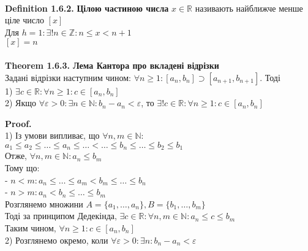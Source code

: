 \documentclass[a4paper, 14pt]{extarticle}
\def\bigline{\vspace{5mm}\\}
\def\defin#1{\textbf{Definition {#1}}}
\def\th#1{\textbf{Theorem {#1}}}
\def\proof{\textbf{Proof.}\\}
\def\bigline{\vspace{5mm}\\}
\begin{document}
\bigline
	\defin{1.6.2.} \textbf{Цілою частиною числа} $x \in \mathbb{R}$ називають найближче менше ціле число $[x]$\\
	Для $h = 1: \exists! n \in \mathbb{Z}: n \leq x < n+1$\\
	$[x] = n$
	\bigline
	\\
	\th{1.6.3. Лема Кантора про вкладені відрізки}\\
	Задані відрізки наступним чином: $\forall n \geq 1: [a_n, b_n] \supset [a_{n+1}, b_{n+1}]$. Тоді\\
	1) $\exists c \in \mathbb{R}: \forall n \geq 1: c \in [a_n,b_n]$\\
	2) Якщо $\forall \varepsilon > 0: \exists n \in \mathbb{N}: b_n - a_n < \varepsilon$, то $\exists! c \in \mathbb{R}: \forall n \geq 1: c \in [a_n,b_n]$
	\begin{figure}[H]
	\centering
	\end{figure}
	\proof
	1) Із умови випливає, що $\forall n,m \in \mathbb{N}:$\\
	$a_1 \leq a_2 \leq \dots \leq a_n \leq \dots < \dots \leq b_n \leq \dots \leq b_2 \leq b_1$\\
	Отже, $\forall n,m \in \mathbb{N}: a_n \leq b_m$\\
	Тому що:\\
	- $n < m: a_n \leq \dots \leq a_m < b_m \leq \dots \leq b_n$\\
	- $n > m: a_n < b_n \leq \dots \leq b_m$\\
	Розглянемо множини $A = \{a_1,\dots,a_n\}, B = \{b_1, \dots, b_m\}$\\
	Тоді за принципом Дедекінда, $\exists c \in \mathbb{R}: \forall n,m \in \mathbb{N}: a_n \leq c \leq b_m$\\
	Таким чином, $\forall n \geq 1: c \in [a_n,b_n]$
	\bigline
	2) Розглянемо окремо, коли $\forall \varepsilon > 0: \exists n: b_n - a_n < \varepsilon$\\
\end{document}
